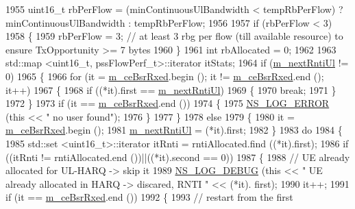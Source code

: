 \begin{DoxyCode}
1955   uint16\_t rbPerFlow = (minContinuousUlBandwidth < tempRbPerFlow) ? minContinuousUlBandwidth : 
      tempRbPerFlow;
1956 
1957   \textcolor{keywordflow}{if} (rbPerFlow < 3)
1958     \{
1959       rbPerFlow = 3;  \textcolor{comment}{// at least 3 rbg per flow (till available resource) to ensure TxOpportunity >= 7
       bytes}
1960     \}
1961   \textcolor{keywordtype}{int} rbAllocated = 0;
1962 
1963   std::map <uint16\_t, pssFlowPerf\_t>::iterator itStats;
1964   \textcolor{keywordflow}{if} (\hyperlink{classns3_1_1PssFfMacScheduler_a9bbe57fde0c3046e43a686473b5e33ff}{m\_nextRntiUl} != 0)
1965     \{
1966       \textcolor{keywordflow}{for} (it = \hyperlink{classns3_1_1PssFfMacScheduler_a7adb86186e0190e6b0aa66a562499268}{m\_ceBsrRxed}.begin (); it != \hyperlink{classns3_1_1PssFfMacScheduler_a7adb86186e0190e6b0aa66a562499268}{m\_ceBsrRxed}.end (); it++)
1967         \{
1968           \textcolor{keywordflow}{if} ((*it).first == \hyperlink{classns3_1_1PssFfMacScheduler_a9bbe57fde0c3046e43a686473b5e33ff}{m\_nextRntiUl})
1969             \{
1970               \textcolor{keywordflow}{break};
1971             \}
1972         \}
1973       \textcolor{keywordflow}{if} (it == \hyperlink{classns3_1_1PssFfMacScheduler_a7adb86186e0190e6b0aa66a562499268}{m\_ceBsrRxed}.end ())
1974         \{
1975           \hyperlink{group__logging_ga0261a8db1d4ac5f79417d117634fd455}{NS\_LOG\_ERROR} (\textcolor{keyword}{this} << \textcolor{stringliteral}{" no user found"});
1976         \}
1977     \}
1978   \textcolor{keywordflow}{else}
1979     \{
1980       it = \hyperlink{classns3_1_1PssFfMacScheduler_a7adb86186e0190e6b0aa66a562499268}{m\_ceBsrRxed}.begin ();
1981       \hyperlink{classns3_1_1PssFfMacScheduler_a9bbe57fde0c3046e43a686473b5e33ff}{m\_nextRntiUl} = (*it).first;
1982     \}
1983   \textcolor{keywordflow}{do}
1984     \{
1985       std::set <uint16\_t>::iterator itRnti = rntiAllocated.find ((*it).first);
1986       \textcolor{keywordflow}{if} ((itRnti != rntiAllocated.end ())||((*it).second == 0))
1987         \{
1988           \textcolor{comment}{// UE already allocated for UL-HARQ -> skip it}
1989           \hyperlink{group__logging_ga413f1886406d49f59a6a0a89b77b4d0a}{NS\_LOG\_DEBUG} (\textcolor{keyword}{this} << \textcolor{stringliteral}{" UE already allocated in HARQ -> discared, RNTI "} << (*it).
      first);
1990           it++;
1991           \textcolor{keywordflow}{if} (it == \hyperlink{classns3_1_1PssFfMacScheduler_a7adb86186e0190e6b0aa66a562499268}{m\_ceBsrRxed}.end ())
1992             \{
1993               \textcolor{comment}{// restart from the first}

\end{DoxyCode}
